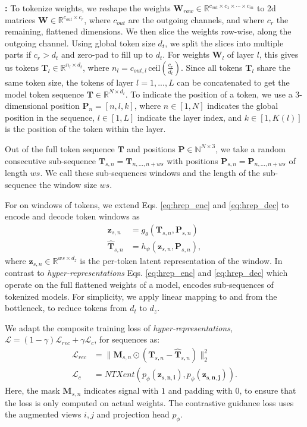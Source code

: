 \textbf{\ourmethod: \ourmethodlong}
\label{sec:seq_hyper_reps}
To tokenize weights, we reshape the weights  $\mathbf{W}_{raw} \in \mathbb{R}^{c_{out}\times c_{1}\times\cdots \times c_{in}}$ to 2d matrices $\mathbf{W} \in \mathbb{R}^{c_{out}\times c_{r}}$, where $c_{out}$ are the outgoing channels, and where $c_{r}$ the remaining, flattened dimensions. 
We then slice the weights row-wise, along the outgoing channel. 
Using global token size $d_t$, we split the slices into multiple parts if $c_r>d_t$ and zero-pad to fill up to $d_t$. 
For weights $\mathbf{W}_l$ of layer $l$, this gives us tokens $\mathbf{T}_l \in \mathbb{R}^{n_l \times d_t}$, where $n_l = c_{out,l} \, \mbox{ceil}(\frac{c_r}{d_t})$. 
Since all tokens $\mathbf{T}_l$ share the same token size, the tokens of layer $l=1,...,L$ can be concatenated to get the model token sequence $\mathbf{T} \in \mathbb{R}^{N\times d_t}$.
To indicate the position of a token, we use a 3-dimensional position $\mathbf{P}_n = [n,l,k]$, where $n\in[1, N]$ indicates the global position in the sequence, $l \in [1, L]$ indicate the layer index, and $k \in [1, K(l)]$ is the position of the token within the layer.

Out of the full token sequence $\mathbf{T}$ and positions $\mathbf{P} \in \mathbb{N}^{N \times 3}$, we take a random consecutive sub-sequence $\mathbf{T}_{s,n}=\mathbf{T}_{n,...,n+ws}$ with positions $\mathbf{P}_{s,n}=\mathbf{P}_{n,...,n+ws}$ of length $ws$. 
We call these sub-sequences windows and the length of the sub-sequence the window size $ws$.

For \ourmethod on windows of tokens, we extend Eqs. \ref{eq:hrep_enc} and \ref{eq:hrep_dec} to encode and decode token windows as
    \begin{align}
        \mathbf{z}_{s,n} &= g_{\theta}(\mathbf{T}_{s,n},\mathbf{P}_{s,n}) \label{eq:seqhrep_enc}\\
        \widehat{\mathbf{T}}_{s,n} &= h_{\psi}( \mathbf{z}_{s,n},\mathbf{P}_{s,n}),\label{eq:seqhrep_dec}
    \end{align}
where $\mathbf{z}_{s,n} \in \mathbb{R}^{ws \times d_z}$ is the per-token latent representation of the window. 
In contrast to \textit{hyper-representations} Eqs. \ref{eq:hrep_enc} and \ref{eq:hrep_dec} which operate on the full flattened weights of a model, \ourmethod encodes sub-sequences of tokenized models.
For simplicity, we apply linear mapping to and from the bottleneck, to reduce tokens from $d_t$ to $d_z$. 

We adapt the composite training loss of \textit{hyper-representations}, $\mathcal{L} = (1-\gamma) \mathcal{L}_{rec} + \gamma \mathcal{L}_c$, for sequences as:
\begin{align}
    \mathcal{L}_{rec} &=\| \mathbf{M}_{s,n} \odot \left( \mathbf{T}_{s,n}-\widehat{\mathbf{T}}_{s,n} \right)\|_2^2 \label{eq:seqhrep_recon_loss} \\
    \mathcal{L}_{c} &= NTXent(p_{\phi}(\mathbf{z_{s,n,i}}),p_{\phi}(\mathbf{z_{s,n,j}})). \label{eq:seqhrep_con_loss}
\end{align}
Here, the mask $\mathbf{M}_{s,n}$ indicates signal with $1$ and padding with $0$, to ensure that the loss is only computed on actual weights. The contrastive guidance loss uses the augmented views $i,j$ and projection head $p_{\phi}$. 


